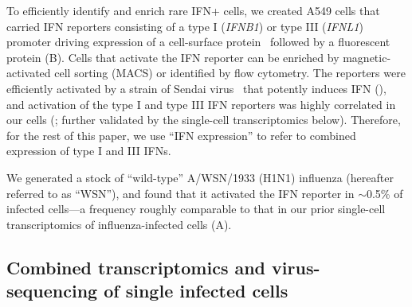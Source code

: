 \documentclass[9pt,lineno]{elife}
\begin{document}
To efficiently identify and enrich rare IFN+ cells, we created A549 cells that carried IFN reporters consisting of a type I (\textit{IFNB1}) or type III (\textit{IFNL1}) promoter driving expression of a cell-surface protein~\citep[LNGFR$\Delta$C;][]{bonini1997hsv,ruggieri1997cell} followed by a fluorescent protein (B).
Cells that activate the IFN reporter can be enriched by magnetic-activated cell sorting (MACS) or identified by flow cytometry.
The reporters were efficiently activated by a strain of Sendai virus~\citep{strahle2006sendai} that potently induces IFN (), and activation of the type I and type III IFN reporters was highly correlated in our cells (; further validated by the single-cell transcriptomics below).
Therefore, for the rest of this paper, we use ``IFN expression'' to refer to combined expression of type I and III IFNs. 

We generated a stock of ``wild-type'' A/WSN/1933 (H1N1) influenza (hereafter referred to as ``WSN''), and found that it activated the IFN reporter in $\sim$0.5\% of infected cells---a frequency roughly comparable to that in our prior single-cell transcriptomics of influenza-infected cells (A).

\subsection{Combined transcriptomics and virus-sequencing of single infected cells}
\end{document}
